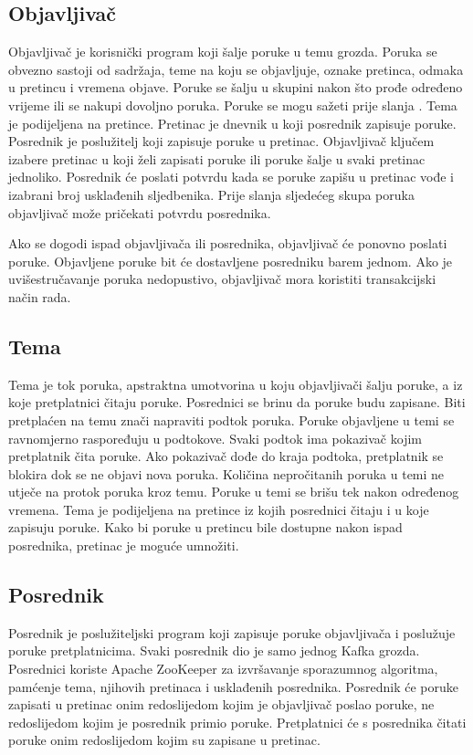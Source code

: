 \documentclass[utf8, diplomski, lmodern, numeric]{fer}
\begin{document}
\subsection{Objavljivač}
Objavljivač  je korisnički program koji šalje poruke u temu grozda. Poruka se obvezno sastoji od sadržaja, teme na koju se objavljuje, oznake pretinca, odmaka u pretincu i vremena objave. Poruke se šalju u skupini nakon što prođe određeno vrijeme ili se nakupi dovoljno poruka. Poruke se mogu sažeti prije slanja \citep{kafka-compression}. Tema je podijeljena na pretince. Pretinac je dnevnik u koji posrednik zapisuje poruke. Posrednik je poslužitelj koji zapisuje poruke u pretinac. Objavljivač ključem izabere pretinac u koji želi zapisati poruke ili poruke šalje u svaki pretinac jednoliko. Posrednik će poslati potvrdu kada se poruke zapišu u pretinac vođe i izabrani broj usklađenih sljedbenika. Prije slanja sljedećeg skupa poruka objavljivač može pričekati potvrdu posrednika.

Ako se dogodi ispad objavljivača ili posrednika, objavljivač će ponovno poslati poruke. Objavljene poruke bit će dostavljene posredniku barem jednom. Ako je uvišestručavanje poruka nedopustivo, objavljivač mora koristiti transakcijski način rada.

\subsection{Tema}
Tema  je tok poruka, apstraktna umotvorina u koju objavljivači šalju poruke, a iz koje pretplatnici čitaju poruke. Posrednici se brinu da poruke budu zapisane. Biti pretplaćen na temu znači napraviti podtok poruka. Poruke objavljene u temi se ravnomjerno raspoređuju u podtokove. Svaki podtok ima pokazivač kojim pretplatnik čita poruke. Ako pokazivač dođe do kraja podtoka, pretplatnik se blokira dok se ne objavi nova poruka. Količina nepročitanih poruka u temi ne utječe na protok poruka kroz temu. Poruke u temi se brišu tek nakon određenog vremena. Tema je podijeljena na pretince iz kojih posrednici čitaju i u koje zapisuju poruke. Kako bi poruke u pretincu bile dostupne nakon ispad posrednika, pretinac je moguće umnožiti.

\subsection{Posrednik}
Posrednik  je poslužiteljski program koji zapisuje poruke objavljivača i poslužuje poruke pretplatnicima. Svaki posrednik dio je samo jednog Kafka grozda. Posrednici koriste Apache ZooKeeper za izvršavanje sporazumnog algoritma, pamćenje tema, njihovih pretinaca i usklađenih posrednika. Posrednik će poruke zapisati u pretinac onim redoslijedom kojim je objavljivač poslao poruke, ne redoslijedom kojim je posrednik primio poruke. Pretplatnici će s posrednika čitati poruke onim redoslijedom kojim su zapisane u pretinac.
\end{document}
